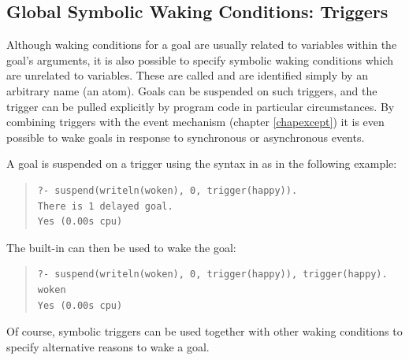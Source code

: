 \subsection{Global Symbolic Waking Conditions: Triggers}
\label{trigger}

Although waking conditions for a goal are usually related to variables
within the goal's arguments, it is also possible to specify symbolic
waking conditions which are unrelated to variables.
%
These are called  and are identified simply by an
arbitrary name (an atom). Goals can be suspended on such triggers,
and the trigger can be pulled explicitly by program code in
particular circumstances. By combining triggers with the event mechanism
(chapter \ref{chapexcept}) it is even possible to wake goals in
response to synchronous or asynchronous events.

A goal is suspended on a trigger using the syntax 
in 
as in the following example:
\begin{quote}
\begin{verbatim}
?- suspend(writeln(woken), 0, trigger(happy)).
There is 1 delayed goal.
Yes (0.00s cpu)
\end{verbatim}
\end{quote}
The built-in
can then be used to wake the goal:
\begin{quote}
\begin{verbatim}
?- suspend(writeln(woken), 0, trigger(happy)), trigger(happy).
woken
Yes (0.00s cpu)
\end{verbatim}
\end{quote}
Of course, symbolic triggers can be used together with other
waking conditions to specify alternative reasons to wake a goal.



